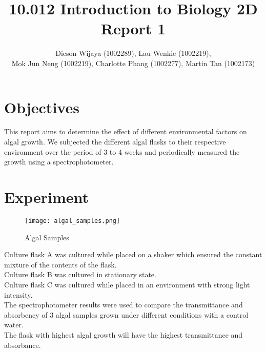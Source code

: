 \documentclass[12pt,a4paper]{article}
\author{Dicson Wijaya (1002289), Lau Wenkie (1002219), \\ Mok Jun Neng (1002219), Charlotte Phang (1002277), Martin Tan (1002173)}
\title{10.012 Introduction to Biology 2D Report 1}
\begin{document}
	
	\maketitle
	
	\section{Objectives}
	This report aims to determine the effect of different environmental factors on algal growth. We subjected the different algal flasks to their respective environment over the period of 3 to 4 weeks and periodically measured the growth using a spectrophotometer.
	
	\section{Experiment}
	\begin{figure}[H]
		\begin{center}
			\texttt{[image: algal\_samples.png]}
			\caption{Algal Samples}
			\label{fig:algalsamples}
		\end{center}
	\end{figure}
    Culture flask A was cultured while placed on a shaker which ensured the constant mixture of the contents of the flask. \\
    
    Culture flask B was cultured in stationary state. \\
    
    Culture flask C was cultured while placed in an environment with strong light intensity. \\
    
    The spectrophotometer results were used to compare the transmittance and absorbency of 3 algal samples grown under different conditions with a control water. \\
    
    The flask with highest algal growth will have the highest transmittance and absorbance.
    
\end{document}
